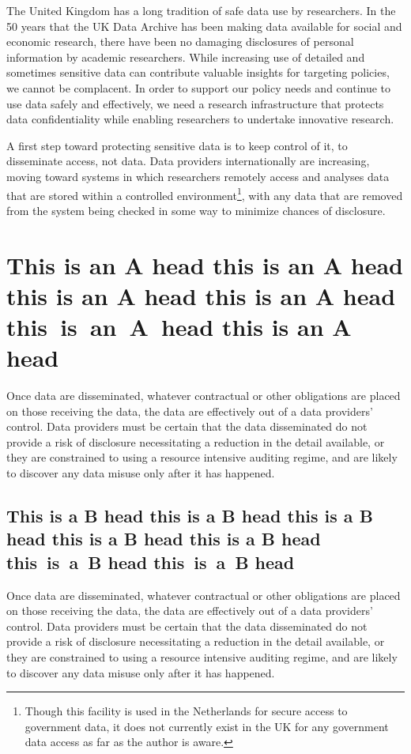 \documentclass{CUP-JNL-DAP}%
\begin{document}
The United Kingdom has a long tradition of safe data use by researchers. In the 50 years that the UK
Data Archive has been making data available for social and economic research, there have been no
damaging disclosures of personal information by academic researchers. While increasing use of detailed and sometimes sensitive
data can contribute valuable insights for targeting policies, we cannot be
complacent. In order to support our policy needs and continue to use data safely and effectively, we
need a research infrastructure that protects data confidentiality while enabling researchers to undertake
innovative research.


A first step toward protecting sensitive data is to keep control of it, to disseminate access, not data. Data
providers internationally are increasing, moving toward systems in which researchers remotely access and
analyses data that are stored within a controlled environment\footnote{Though this facility is used in the Netherlands for secure access to government data, it does not currently exist in the UK for any
government data access as far as the author is aware.}, with any data that are removed from the
system being checked in some way to minimize chances of disclosure.

\section[This is an A Head]{This is an A head this is an A head this is an A head this is an A head  this~is~an~A~head this is an A head}

Once data are disseminated, whatever contractual or other obligations are placed on those receiving the
data, the data are effectively out of a data providers' control. Data providers must be certain that the data
disseminated do not provide a risk of disclosure necessitating a reduction in the detail available, or they are
constrained to using a resource intensive auditing regime, and are likely to discover any data misuse only
after it has happened.

\subsection{This is a B head this is a B head this is a B head this is a B head this is a B head this~is~a~B head this~is~a~B head}

Once data are disseminated, whatever contractual or other obligations are placed on those receiving the
data, the data are effectively out of a data providers' control. Data providers must be certain that the data
disseminated do not provide a risk of disclosure necessitating a reduction in the detail available, or they are
constrained to using a resource intensive auditing regime, and are likely to discover any data misuse only
after it has happened.
\end{document}
